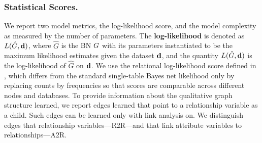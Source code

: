 \documentclass{acm_proc_article-sp}
\begin{document}
\subsubsection{Statistical Scores.}
We report two model metrics, the log-likelihood score, and the model complexity as measured by the number of parameters. The \textbf{log-likelihood} is denoted as $L(\hat{G},\mathbf{d})$, where $\hat{G}$ is the BN $G$ with its parameters instantiated to be the maximum likelihood estimates given the dataset $\mathbf{d}$, and the quantity $L(\hat{G},\mathbf{d})$ is the log-likelihood of $\hat{G}$ on $\mathbf{d}$. 
We use the relational log-likelihood score defined in \cite{Schulte2011}, 
which differs from the standard single-table Bayes net  likelihood %
only by replacing counts by frequencies  so that scores are comparable across different nodes and databases. 
%
To provide information about the qualitative graph structure learned, we report edges learned that point to a relationship variable as a child. Such edges can be learned only with link analysis on. We distinguish edges that relationship variables---R2R---and that link attribute variables to relationships---A2R.
\end{document}
